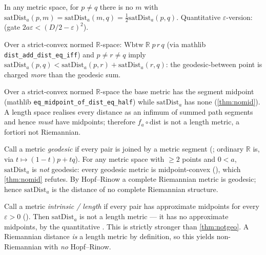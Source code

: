 \begin{theorem}[No midpoint]\label{thm:nomid}
\leanok
In any metric space, for $p\ne q$ there is no $m$ with
$\mathrm{satDist}_a(p,m)=\mathrm{satDist}_a(m,q)=\tfrac12\mathrm{satDist}_a(p,q)$.
Quantitative $\varepsilon$-version:  (gate
$2a\varepsilon<(D/2-\varepsilon)^2$).
\end{theorem}

\begin{theorem}\label{thm:wbtw}
\leanok
Over a strict-convex normed $\mathbb{R}$-space: $\mathrm{Wbtw}\;\mathbb{R}\;p\,r\,q$
(via mathlib \texttt{dist\_add\_dist\_eq\_iff}) and $p\ne r\ne q$ imply
$\mathrm{satDist}_a(p,q)<\mathrm{satDist}_a(p,r)+\mathrm{satDist}_a(r,q)$: the
geodesic-between point is charged \emph{more} than the geodesic sum.
\end{theorem}

\begin{theorem}\label{thm:break}
\leanok
Over a strict-convex normed $\mathbb{R}$-space the base metric has the segment
midpoint (mathlib \texttt{eq\_midpoint\_of\_dist\_eq\_half}) while
$\mathrm{satDist}_a$ has none (\cref{thm:nomid}). A length space realises every
distance as an infimum of summed path segments and hence \emph{must} have
midpoints; therefore $f_a\circ\mathrm{dist}$ is not a length metric, a fortiori
not Riemannian.
\end{theorem}

\begin{theorem}\label{thm:notgeo}
\leanok
Call a metric \emph{geodesic} if every pair is joined by a metric segment
(; ordinary $\mathbb{R}$ is, via $t\mapsto(1-t)p+tq$). For
any metric space with $\ge 2$ points and $0<a$, $\mathrm{satDist}_a$ is \emph{not}
geodesic: every geodesic metric is midpoint-convex
(), which \cref{thm:nomid} refutes. By
Hopf--Rinow a complete Riemannian metric is geodesic; hence $\mathrm{satDist}_a$
is the distance of no complete Riemannian structure.
\end{theorem}

\begin{theorem}\label{thm:notlen}
\leanok
Call a metric \emph{intrinsic / length} if every pair has approximate midpoints for
every $\varepsilon>0$ (). Then $\mathrm{satDist}_a$ is not a
length metric --- it has no approximate midpoints, by the quantitative
. This is strictly stronger than \cref{thm:notgeo}.
A Riemannian distance \emph{is} a length metric by definition, so this yields
non-Riemannian with \emph{no} Hopf--Rinow.
\end{theorem}

